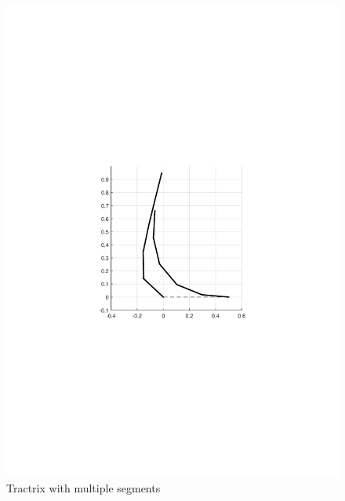 \documentclass[11pt,a4paper]{article}
\begin{document}
\begin{figure}[h]
\centering
\includegraphics[scale=0.75]{figures/fig2.pdf}
\caption{Tractrix with multiple segments\label{fig2}}
\end{figure}
\end{document}

